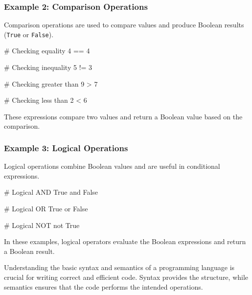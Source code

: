 \documentclass[
  letterpaper,
  DIV=11,
  numbers=noendperiod]{scrreprt}
\newenvironment{Shaded}{\begin{snugshade}}{\end{snugshade}}
\newcommand{\CommentTok}[1]{\textcolor[rgb]{0.37,0.37,0.37}{#1}}
\newcommand{\DecValTok}[1]{\textcolor[rgb]{0.68,0.00,0.00}{#1}}
\newcommand{\KeywordTok}[1]{\textcolor[rgb]{0.00,0.23,0.31}{#1}}
\newcommand{\OperatorTok}[1]{\textcolor[rgb]{0.37,0.37,0.37}{#1}}
\newcommand{\VariableTok}[1]{\textcolor[rgb]{0.07,0.07,0.07}{#1}}
\begin{document}
\hypertarget{example-2-comparison-operations}{%
\subsubsection{Example 2: Comparison
Operations}\label{example-2-comparison-operations}}

Comparison operations are used to compare values and produce Boolean
results (\texttt{True} or \texttt{False}).

\begin{Shaded}
\begin{Highlighting}[]
\CommentTok{\# Checking equality}
\DecValTok{4} \OperatorTok{==} \DecValTok{4}

\CommentTok{\# Checking inequality}
\DecValTok{5} \OperatorTok{!=} \DecValTok{3}

\CommentTok{\# Checking greater than}
\DecValTok{9} \OperatorTok{\textgreater{}} \DecValTok{7}

\CommentTok{\# Checking less than}
\DecValTok{2} \OperatorTok{\textless{}} \DecValTok{6}
\end{Highlighting}
\end{Shaded}

These expressions compare two values and return a Boolean value based on
the comparison.

\hypertarget{example-3-logical-operations}{%
\subsubsection{Example 3: Logical
Operations}\label{example-3-logical-operations}}

Logical operations combine Boolean values and are useful in conditional
expressions.

\begin{Shaded}
\begin{Highlighting}[]
\CommentTok{\# Logical AND}
\VariableTok{True} \KeywordTok{and} \VariableTok{False}

\CommentTok{\# Logical OR}
\VariableTok{True} \KeywordTok{or} \VariableTok{False}

\CommentTok{\# Logical NOT}
\KeywordTok{not} \VariableTok{True}
\end{Highlighting}
\end{Shaded}

In these examples, logical operators evaluate the Boolean expressions
and return a Boolean result.

Understanding the basic syntax and semantics of a programming language
is crucial for writing correct and efficient code. Syntax provides the
structure, while semantics ensures that the code performs the intended
operations.
\end{document}
